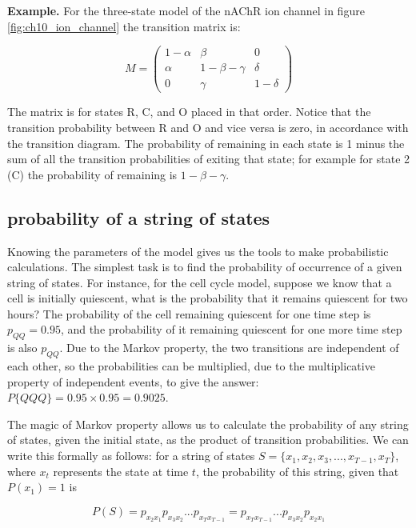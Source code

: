 \documentclass[
  letterpaper,
  DIV=11,
  numbers=noendperiod]{scrreprt}
\begin{document}
\textbf{Example.} For the three-state model of the nAChR ion channel in
figure \ref{fig:ch10_ion_channel} the transition matrix is:

\[ 
M = \left(\begin{array}{ccc} 1-\alpha & \beta & 0  \\ \alpha & 1-\beta-\gamma & \delta \\ 0 & \gamma & 1-\delta \end{array}\right)
\]

The matrix is for states R, C, and O placed in that order. Notice that
the transition probability between R and O and vice versa is zero, in
accordance with the transition diagram. The probability of remaining in
each state is 1 minus the sum of all the transition probabilities of
exiting that state; for example for state 2 (C) the probability of
remaining is \(1-\beta-\gamma\).

\hypertarget{probability-of-a-string-of-states}{%
\subsection{probability of a string of
states}\label{probability-of-a-string-of-states}}

Knowing the parameters of the model gives us the tools to make
probabilistic calculations. The simplest task is to find the probability
of occurrence of a given string of states. For instance, for the cell
cycle model, suppose we know that a cell is initially quiescent, what is
the probability that it remains quiescent for two hours? The probability
of the cell remaining quiescent for one time step is \(p_{QQ} = 0.95\),
and the probability of it remaining quiescent for one more time step is
also \(p_{QQ}\). Due to the Markov property, the two transitions are
independent of each other, so the probabilities can be multiplied, due
to the multiplicative property of independent events, to give the
answer: \(P\{QQQ\} = 0.95\times0.95 = 0.9025\).

The magic of Markov property allows us to calculate the probability of
any string of states, given the initial state, as the product of
transition probabilities. We can write this formally as follows: for a
string of states \(S = \{x_1, x_2, x_3, ... , x_{T-1}, x_T\}\), where
\(x_t\) represents the state at time \(t\), the probability of this
string, given that \(P(x_1) = 1\) is

\[ 
P(S) =  p_{x_2x_1} p_{x_3x_2} ... p_{x_Tx_{T-1}} =  p_{x_Tx_{T-1}} ... p_{x_3x_2}p_{x_2x_1}
\]
\end{document}
